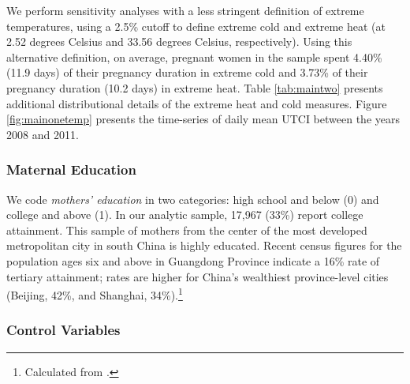 We perform sensitivity analyses with a less stringent
definition of extreme temperatures, using a 2.5\% cutoff to define
extreme cold and extreme heat (at 2.52 degrees Celsius and 33.56 degrees Celsius,
respectively). Using this alternative definition, on average, pregnant women in the sample spent 4.40\% (11.9 days) of their pregnancy duration in extreme cold and 3.73\% of their pregnancy duration
(10.2 days) in extreme heat. Table \ref{tab:maintwo} presents
additional distributional details of the extreme heat and cold measures. Figure \ref{fig:mainonetemp} presents the time-series of daily mean UTCI between the years 2008 and 2011. 

\subsubsection{Maternal Education\label{maternal-education}}

We code \emph{mothers' education} in two categories: high school and
below (0) and college and above (1). In our analytic sample, 17,967
(33\%) report college attainment. This sample of mothers from the center of the most developed metropolitan city 
in south China is highly educated. Recent census figures for the population ages six and above in Guangdong Province indicate a 16\% rate of tertiary attainment; rates are higher for China's wealthiest province-level cities (Beijing, 42\%, and Shanghai, 34\%).\footnote{Calculated from \textcite{national_bureau_of_statistics_of_china_communique_2021}.}

\subsubsection{Control Variables\label{control-variables}}

